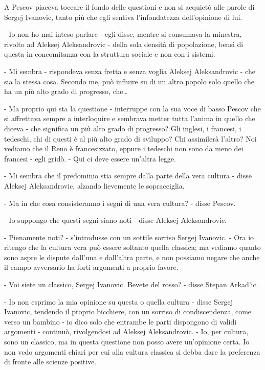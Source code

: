 A Pescov piaceva toccare il fondo delle questioni e non si acquietò alle parole di Sergej Ivanovic, tanto più che egli sentiva l'infondatezza dell'opinione di lui. 

- Io non ho mai inteso parlare - egli disse, mentre si consumava la minestra, rivolto ad Aleksej Aleksandrovic - della sola densità di popolazione, bensì di questa in concomitanza con la struttura sociale e non con i sistemi. 

- Mi sembra - rispondeva senza fretta e senza voglia Aleksej Aleksandrovic - che sia la stessa cosa. Secondo me, può influire su di un altro popolo solo quello che ha un più alto grado di progresso, che\ldots{} 

- Ma proprio qui sta la questione - interruppe con la sua voce di basso Pescov che si affrettava sempre a interloquire e sembrava metter tutta l'anima in quello che diceva - che significa un più alto grado di progresso? Gli inglesi, i francesi, i tedeschi, chi di questi è al più alto grado di sviluppo? Chi assimilerà l'altro? Noi vediamo che il Reno è francesizzato, eppure i tedeschi non sono da meno dei francesi - egli gridò. - Qui ci deve essere un'altra legge. 

- Mi sembra che il predominio stia sempre dalla parte della vera cultura - disse Aleksej Aleksandrovic, alzando lievemente le sopracciglia. 

- Ma in che cosa consisteranno i segni di una vera cultura? - disse Pescov. 

- Io suppongo che questi segni siano noti - disse Aleksej Aleksandrovic. 

- Pienamente noti? - s'introdusse con un sottile sorriso Sergej Ivanovic. - Ora io ritengo che la cultura vera può essere soltanto quella classica; ma vediamo quanto sono aspre le dispute dall'una e dall'altra parte, e non possiamo negare che anche il campo avversario ha forti argomenti a proprio favore. 

- Voi siete un classico, Sergej Ivanovic. Bevete del rosso? - disse Stepan Arkad'ic. 

- Io non esprimo la mia opinione su questa o quella cultura - disse Sergej Ivanovic, tendendo il proprio bicchiere, con un sorriso di condiscendenza, come verso un bambino - io dico solo che entrambe le parti dispongono di validi argomenti - continuò, rivolgendosi ad Aleksej Aleksandrovic. - Io, per cultura, sono un classico, ma in questa questione non posso avere un'opinione certa. Io non vedo argomenti chiari per cui alla cultura classica si debba dare la preferenza di fronte alle scienze positive. 

